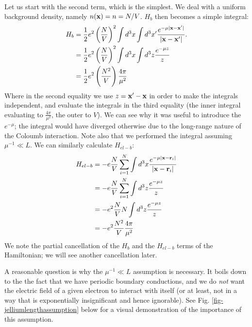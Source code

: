 Let us start with the second term, which is the simplest. We deal with a uniform background density, namely $n(\mathbf{x}) = n = N/V$. $H_b$ then becomes a simple integral:
\begin{equation}
    \begin{split}
        H_b &= \frac{1}{2}e^2\left(\frac{N}{V}\right)^2 \int d^3x \int d^3 x' \frac{e^{-\mu\lvert \mathbf{x} - \mathbf{x}' \rvert}}{\lvert \mathbf{x} - \mathbf{x}' \rvert}.
        \\ &= \frac{1}{2}e^2\left(\frac{N}{V}\right)^2 \int d^3x \int d^3z \frac{e^{-\mu z}}{z}
        \\ &= \frac{1}{2}e^{2}\left(\frac{N^2}{V}\right)\frac{4\pi}{\mu^2}
    \end{split}
\end{equation}
Where in the second equality we use $z = \mathbf{x}' - \mathbf{x}$ in order to make the integrals independent, and evaluate the integrals in the third equality (the inner integral evaluating to $\frac{4\pi}{\mu^2}$, the outer to $V$). We can see why it was useful to introduce the $e^{-\mu}$; the integral would have diverged otherwise due to the long-range nature of the Coloumb interaction. Note also that we performed the integral assuming $\mu^{-1} \ll L$. We can similarly calculate $H_{el-b}$:
\begin{equation}
    \begin{split}
        H_{el-b} &= -e\frac{N}{V}\sum_{i=1}^N \int d^3x \frac{e^{-\mu\lvert \mathbf{x} - \mathbf{r}_i \rvert}}{\lvert \mathbf{x} - \mathbf{r}_i \rvert}
        \\ &= -e\frac{N}{V}\sum_{i=1}^N \int d^3z \frac{e^{-\mu z}}{z}
        \\ &= -e^2 \frac{N}{V} N \int d^3z\frac{e^{-\mu z}}{z}
        \\ &= -e^2\frac{N^2}{V}\frac{4\pi}{\mu^2}
    \end{split}
\end{equation}
We note the partial cancellation of the $H_b$ and the $H_{el-b}$ terms of the Hamiltonian; we will see another cancellation later.

A reasonable question is why the $\mu^{-1} \ll L$ assumption is necessary. It boils down to the the fact that we have periodic boundary conductions, and we do \emph{not} want the electric field of a given electron to interact with itself (or at least, not in a way that is exponentially insignificant and hence ignorable). See Fig. \ref{fig-jelliumlengthassumption} below for a visual demonstration of the importance of this assumption.

